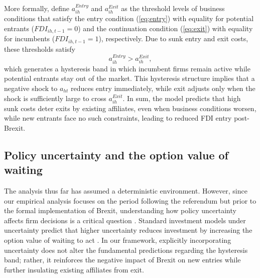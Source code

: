 \documentclass[preprint,11pt,authoryear]{elsarticle}
\begin{document}
More formally, define $a_{ih}^{Entry}$ and $a_{ih}^{Exit}$ as the threshold levels of business conditions that satisfy the entry condition (\ref{eq:entry}) with equality for potential entrants ($FDI_{ih,t-1}=0$) and the continuation condition (\ref{eq:exit}) with equality for incumbents ($FDI_{ih,t-1}=1$), respectively. Due to sunk entry and exit costs, these thresholds satisfy
\begin{equation}
a_{ih}^{Entry} > a_{ih}^{Exit},
\end{equation}
which generates a hysteresis band in which incumbent firms remain active while potential entrants stay out of the market.
This hysteresis structure implies that a negative shock to $a_{ht}$ reduces entry immediately, while exit adjusts only when the shock is sufficiently large to cross $a_{ih}^{Exit}$.
In sum, the model predicts that high sunk costs deter exits by existing affiliates, even when business conditions worsen, while new entrants face no such constraints, leading to reduced FDI entry post-Brexit.




\subsection{Policy uncertainty and the option value of waiting}

The analysis thus far has assumed a deterministic environment. However, since our empirical analysis focuses on the period following the referendum but prior to the formal implementation of Brexit, understanding how policy uncertainty affects firm decisions is a critical question \citep{graziano2021brexit, tamberi2024export}. 
Standard investment models under uncertainty predict that higher uncertainty reduces investment by increasing the option value of waiting to act \citep{dixit1992, bloom2018brexit}. 
In our framework, explicitly incorporating uncertainty does not alter the fundamental predictions regarding the hysteresis band; rather, it reinforces the negative impact of Brexit on new entries while further insulating existing affiliates from exit.
\end{document}
